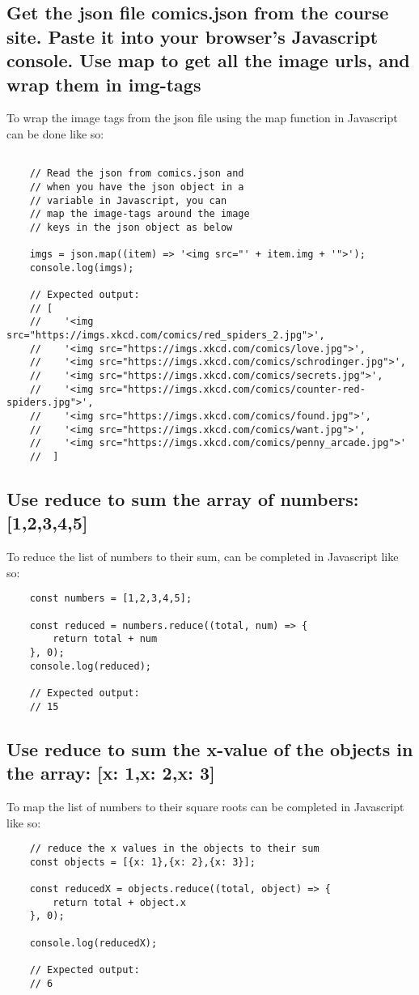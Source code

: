 \documentclass{article}
\begin{document}
\subsection{Get the json file comics.json from the course site. Paste it into your browser’s Javascript console. Use map to get all the image urls, and wrap them in img-tags}
To wrap the image tags from the json file using the map function in Javascript can be done like so:
\begin{lstlisting}
    
    // Read the json from comics.json and 
    // when you have the json object in a 
    // variable in Javascript, you can 
    // map the image-tags around the image
    // keys in the json object as below 

    imgs = json.map((item) => '<img src="' + item.img + '">');
    console.log(imgs);

    // Expected output:
    // [
    //    '<img src="https://imgs.xkcd.com/comics/red_spiders_2.jpg">',
    //    '<img src="https://imgs.xkcd.com/comics/love.jpg">',
    //    '<img src="https://imgs.xkcd.com/comics/schrodinger.jpg">',
    //    '<img src="https://imgs.xkcd.com/comics/secrets.jpg">',
    //    '<img src="https://imgs.xkcd.com/comics/counter-red-spiders.jpg">',
    //    '<img src="https://imgs.xkcd.com/comics/found.jpg">',
    //    '<img src="https://imgs.xkcd.com/comics/want.jpg">',
    //    '<img src="https://imgs.xkcd.com/comics/penny_arcade.jpg">'
    //  ]

\end{lstlisting}

\subsection{Use reduce to sum the array of numbers: [1,2,3,4,5]}
\lstset{language=Java}
To reduce the list of numbers to their sum, can be completed in Javascript like so:
\begin{lstlisting}
    const numbers = [1,2,3,4,5];

    const reduced = numbers.reduce((total, num) => {
        return total + num
    }, 0);
    console.log(reduced);

    // Expected output:
    // 15

\end{lstlisting}

\subsection{Use reduce to sum the x-value of the objects in the array: [{x: 1},{x: 2},{x: 3}]}
\lstset{language=Java}
To map the list of numbers to their square roots can be completed in Javascript like so:
\begin{lstlisting}
    // reduce the x values in the objects to their sum
    const objects = [{x: 1},{x: 2},{x: 3}];

    const reducedX = objects.reduce((total, object) => {
        return total + object.x
    }, 0);

    console.log(reducedX);

    // Expected output:
    // 6

\end{lstlisting}
\end{document}
